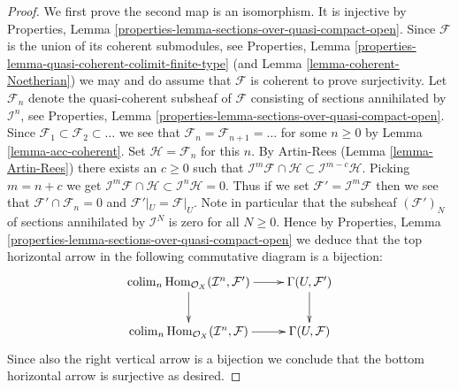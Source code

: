 \begin{proof}
We first prove the second map is an isomorphism. It is injective by 
Properties, Lemma \ref{properties-lemma-sections-over-quasi-compact-open}.
Since $\mathcal{F}$ is the union of its coherent submodules, see
Properties, Lemma \ref{properties-lemma-quasi-coherent-colimit-finite-type}
(and Lemma \ref{lemma-coherent-Noetherian})
we may and do assume that $\mathcal{F}$ is coherent to prove surjectivity.
Let $\mathcal{F}_n$ denote the quasi-coherent subsheaf of $\mathcal{F}$
consisting of sections annihilated by $\mathcal{I}^n$,
see Properties, Lemma \ref{properties-lemma-sections-over-quasi-compact-open}.
Since $\mathcal{F}_1 \subset \mathcal{F}_2 \subset \ldots$ we see that
$\mathcal{F}_n = \mathcal{F}_{n + 1} = \ldots $ for some $n \geq 0$
by Lemma \ref{lemma-acc-coherent}. Set $\mathcal{H} = \mathcal{F}_n$
for this $n$. By Artin-Rees (Lemma \ref{lemma-Artin-Rees})
there exists an $c \geq 0$ such that
$\mathcal{I}^m\mathcal{F} \cap \mathcal{H}
\subset \mathcal{I}^{m - c}\mathcal{H}$. Picking $m = n + c$ we get
$\mathcal{I}^m\mathcal{F} \cap \mathcal{H} \subset \mathcal{I}^n\mathcal{H}
= 0$. Thus if we set $\mathcal{F}' = \mathcal{I}^m\mathcal{F}$ then we
see that $\mathcal{F}' \cap \mathcal{F}_n = 0$ and
$\mathcal{F}'|_U = \mathcal{F}|_U$. Note in particular that the subsheaf
$(\mathcal{F}')_N$ of sections annihilated by $\mathcal{I}^N$ is zero
for all $N \geq 0$. Hence by
Properties, Lemma \ref{properties-lemma-sections-over-quasi-compact-open}
we deduce that
the top horizontal arrow in the following commutative
diagram is a bijection:
$$
\xymatrix{
\colim_n \Hom_{\mathcal{O}_X}(
\mathcal{I}^n, \mathcal{F}')
\ar[r] \ar[d] &
\Gamma(U, \mathcal{F}') \ar[d] \\
\colim_n \Hom_{\mathcal{O}_X}(
\mathcal{I}^n, \mathcal{F})
\ar[r] &
\Gamma(U, \mathcal{F})
}
$$
Since also the right vertical arrow is a bijection we conclude that
the bottom horizontal arrow is surjective as desired.


\end{proof}
